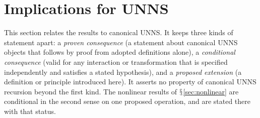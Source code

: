 \documentclass[11pt,a4paper]{article}
\renewcommand{\S}{\ensuremath{\mathsection}}
\theoremstyle{plain}
\theoremstyle{definition}
\begin{document}
\section{Implications for UNNS}\label{sec:unns}
This section relates the results to canonical UNNS. It keeps three kinds of statement apart: a \emph{proven consequence} (a statement about canonical UNNS objects that follows by proof from adopted definitions alone), a \emph{conditional consequence} (valid for any interaction or transformation that is specified independently and satisfies a stated hypothesis), and a \emph{proposed extension} (a definition or principle introduced here). It asserts no property of canonical UNNS recursion beyond the first kind. The nonlinear results of \S\ref{sec:nonlinear} are conditional in the second sense on one proposed operation, and are stated there with that status.
\end{document}
